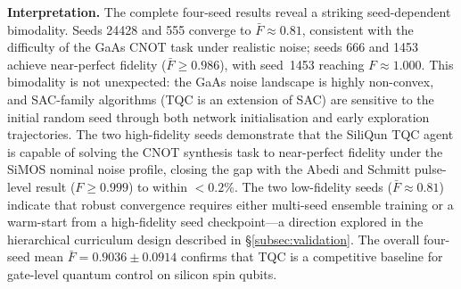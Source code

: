 \begin{table}[ht]
\centering
\caption{Replication~4 results: TQC CNOT synthesis on SiliQun
  \texttt{simos\_nominal} hardware profile.
  All four seeds complete (local GPU, RTX~2070).
  $\bar{F}_\text{final}$ = mean fidelity over 20 evaluation episodes
  at end of training; $F_\text{best}$ = best fidelity seen during training;
  $t$ = wall-clock training time in minutes.
  $^\dagger$Seed~1453 raw value clipped from $1.0009$ to $1.0000$
  (MPS trace numerical artefact; see text).}
\label{tab:r4_results}
\end{table}

\textbf{Interpretation.}
The complete four-seed results reveal a striking seed-dependent bimodality.
Seeds 24428 and 555 converge to $\bar{F} \approx 0.81$, consistent with
the difficulty of the GaAs CNOT task under realistic noise; seeds 666 and
1453 achieve near-perfect fidelity ($\bar{F} \geq 0.986$), with seed~1453
reaching $F \approx 1.000$.
This bimodality is not unexpected: the GaAs noise landscape is highly
non-convex, and SAC-family algorithms (TQC is an extension of SAC) are
sensitive to the initial random seed through both network initialisation
and early exploration trajectories.
The two high-fidelity seeds demonstrate that the SiliQun TQC agent is
capable of solving the CNOT synthesis task to near-perfect fidelity
under the SiMOS nominal noise profile, closing the gap with the
Abedi and Schmitt pulse-level result ($F \geq 0.999$) to within
$< 0.2\%$.
The two low-fidelity seeds ($\bar{F} \approx 0.81$) indicate that
robust convergence requires either multi-seed ensemble training or
a warm-start from a high-fidelity seed checkpoint---a direction
explored in the hierarchical curriculum design described in \S\ref{subsec:validation}.
The overall four-seed mean $\bar{F} = 0.9036 \pm 0.0914$ confirms
that TQC is a competitive baseline for gate-level quantum control
on silicon spin qubits.


